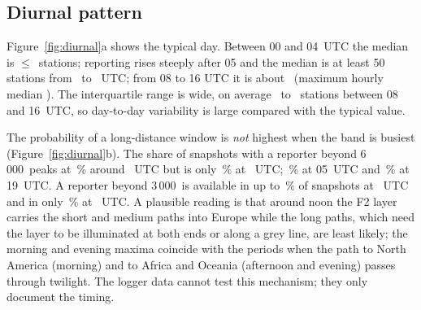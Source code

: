 \documentclass[10pt,a4paper]{article}
\begin{document}

\subsection{Diurnal pattern}
Figure~\ref{fig:diurnal}a shows the typical day. Between 00 and 04~UTC the median is $\le$\quietMedMax\ stations; reporting rises steeply after 05 and the median is at least 50 stations from \busyFrom\ to \busyTo~UTC; from 08 to 16 UTC it is about \busyMedAvg\ (maximum hourly median \hourMaxMed). The interquartile range is wide, on average \qLoMid\ to \qHiMid\ stations between 08 and 16~UTC, so day-to-day variability is large compared with the typical value.

The probability of a long-distance window is \emph{not} highest when the band is busiest (Figure~\ref{fig:diurnal}b). The share of snapshots with a reporter beyond 6\,000\km\ peaks at \dxPeakPct\,\% around \dxPeakHour~UTC but is only \dxLowPct\,\% at \dxLowHour~UTC; \dxAtF\,\% at 05~UTC and \dxAtBJ\,\% at 19~UTC. A reporter beyond 3\,000\km\ is available in up to \peakThreePct\,\% of snapshots at \peakThreeHour~UTC and in only \lowThreePct\,\% at \lowThreeHour~UTC. A plausible reading is that around noon the F2 layer carries the short and medium paths into Europe while the long paths, which need the layer to be illuminated at both ends or along a grey line, are least likely; the morning and evening maxima coincide with the periods when the path to North America (morning) and to Africa and Oceania (afternoon and evening) passes through twilight. The logger data cannot test this mechanism; they only document the timing.

\end{document}
